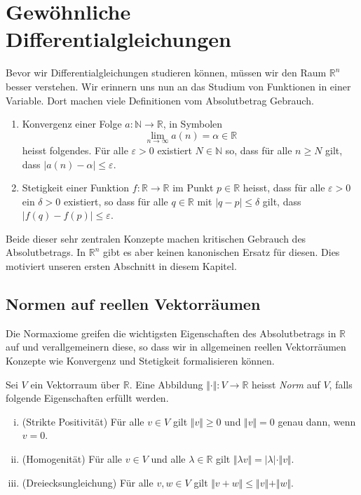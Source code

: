 \documentclass[../main.tex]{subfiles}
\begin{document}
\chapter{Gewöhnliche Differentialgleichungen}\label{chp:odes}
Bevor wir Differentialgleichungen studieren können,
müssen wir den Raum $\mathbb{R}^n$ besser verstehen.
Wir erinnern uns nun an das Studium von Funktionen
in einer Variable.
Dort machen viele Definitionen
vom Absolutbetrag Gebrauch.

\begin{examples}
  \leavevmode
  \begin{enumerate}[(1)]
    \item Konvergenz einer Folge $a \colon \mathbb{N} \to \mathbb{R}$,
      in Symbolen
      \[
        \lim_{n \to \infty} a(n) = \alpha \in \mathbb{R}
      \]
      heisst folgendes. Für alle $\varepsilon > 0$ existiert
      $N \in \mathbb{N}$ so, dass für alle $n \geq N$ 
      gilt, dass $|a(n) - \alpha| \leq \varepsilon$.
    \item Stetigkeit einer Funktion $f \colon \mathbb{R} \to \mathbb{R}$ 
      im Punkt $p\in \mathbb{R}$ heisst, dass für alle $\varepsilon > 0$ 
      ein $\delta > 0$ existiert, so dass
      für alle $q \in \mathbb{R}$ mit $|q - p| \leq \delta$ gilt,
      dass $|f(q) - f(p)| \leq \varepsilon$.
  \end{enumerate}
\end{examples}

Beide dieser sehr zentralen Konzepte machen kritischen Gebrauch
des Absolutbetrags.
In $\mathbb{R}^n$ gibt es aber keinen kanonischen Ersatz für diesen.
Dies motiviert unseren ersten Abschnitt in diesem Kapitel.

\section{Normen auf reellen Vektorräumen}
Die Normaxiome greifen die wichtigsten Eigenschaften des
Absolutbetrags in $\mathbb{R}$ auf und verallgemeinern
diese, so dass wir in allgemeinen reellen Vektorräumen
Konzepte wie Konvergenz und Stetigkeit formalisieren können.

\begin{definition}
  Sei $V$ ein Vektorraum über $\mathbb{R}$.
  Eine Abbildung $\Vert \cdot \Vert \colon V \to \mathbb{R}$
  heisst \emph{Norm} auf $V$, falls folgende Eigenschaften erfüllt werden.
  \begin{enumerate}[(i)]
    \item (Strikte Positivität)
      Für alle $v \in V$ gilt $\Vert v \Vert \geq 0$ und
      $\Vert v \Vert = 0$ genau dann, wenn $v = 0$.
    \item (Homogenität)
      Für alle $v \in V$ und alle $\lambda \in \mathbb{R}$ gilt
      $\Vert \lambda v \Vert = |\lambda| \cdot \Vert v \Vert$.
    \item (Dreiecksungleichung)
      Für alle $v, w \in V$ gilt $\Vert v + w \Vert \leq \Vert v \Vert
      + \Vert w \Vert$.
  \end{enumerate}
\end{definition}
\end{document}
